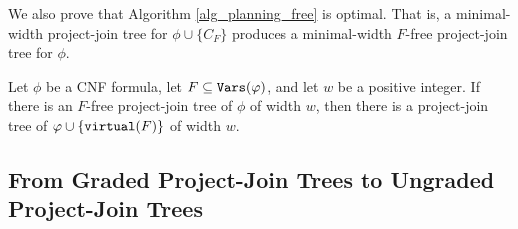 We also prove that Algorithm \ref{alg_planning_free} is optimal. That is, a minimal-width project-join tree for $\phi \cup \{C_F\}$ produces a minimal-width $F$-free project-join tree for $\phi$. 
\begin{theorem}
\label{thm:planning_free_optimal}
Let $\phi$ be a CNF formula, let $F \subseteq \texttt{\upshape Vars}(\varphi)$, and let $w$ be a positive integer. %
If there is an $F$-free project-join tree of $\phi$ of width $w$, then there is a project-join tree of $\varphi \cup \{\texttt{\upshape virtual}(F)\}$ of width $w$.
\end{theorem}



\subsection{From Graded Project-Join Trees to Ungraded Project-Join Trees}

